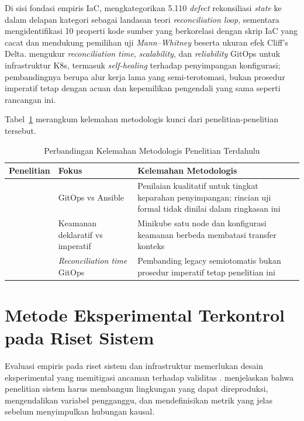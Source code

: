 Di sisi fondasi empiris IaC, \citet{hassan2024reconciliation} mengkategorikan 5.110 \textit{defect} rekonsiliasi \textit{state} ke dalam delapan kategori sebagai landasan teori \textit{reconciliation loop}, sementara \citet{rahman2019properties} mengidentifikasi 10 properti kode sumber yang berkorelasi dengan skrip IaC yang cacat dan mendukung pemilihan uji \textit{Mann--Whitney} beserta ukuran efek Cliff's Delta. \citet{matubber2025managing} mengukur \textit{reconciliation time}, \textit{scalability}, dan \textit{reliability} GitOps untuk infrastruktur K8s, termasuk \textit{self-healing} terhadap penyimpangan konfigurasi; pembandingnya berupa alur kerja lama yang semi-terotomasi, bukan prosedur imperatif tetap dengan acuan dan kepemilikan pengendali yang sama seperti rancangan ini.

Tabel~\ref{tab:literatur-comparison} merangkum kelemahan metodologis kunci dari penelitian-penelitian tersebut.

\begin{table}[H]
  \centering
  \small
  \caption{Perbandingan Kelemahan Metodologis Penelitian Terdahulu}
  \label{tab:literatur-comparison}
  \begin{tabular}{|>{\raggedright\arraybackslash}p{3.4cm}|>{\raggedright\arraybackslash}p{3.2cm}|>{\raggedright\arraybackslash}p{5.8cm}|}
    \hline
    Penelitian & Fokus & Kelemahan Metodologis \\
    \hline
    \citet{shrestha2024configuration} & GitOps vs Ansible & Penilaian kualitatif untuk tingkat keparahan penyimpangan; rincian uji formal tidak dinilai dalam ringkasan ini \\
    \hline
    \citet{kaggantinataraja2025security} & Keamanan deklaratif vs imperatif & Minikube satu node dan konfigurasi keamanan berbeda membatasi transfer konteks \\
    \hline
    \citet{matubber2025managing} & \textit{Reconciliation time} GitOps & Pembanding legacy semiotomatis bukan prosedur imperatif tetap penelitian ini \\
    \hline
  \end{tabular}
\end{table}

\section{Metode Eksperimental Terkontrol pada Riset Sistem}

Evaluasi empiris pada riset sistem dan infrastruktur memerlukan desain eksperimental yang memitigasi ancaman terhadap validitas \citep{wohlin2012experimentation}. \citet{limoncelli2018} menjelaskan bahwa penelitian sistem harus membangun lingkungan yang dapat direproduksi, mengendalikan variabel pengganggu, dan mendefinisikan metrik yang jelas sebelum menyimpulkan hubungan kausal.

